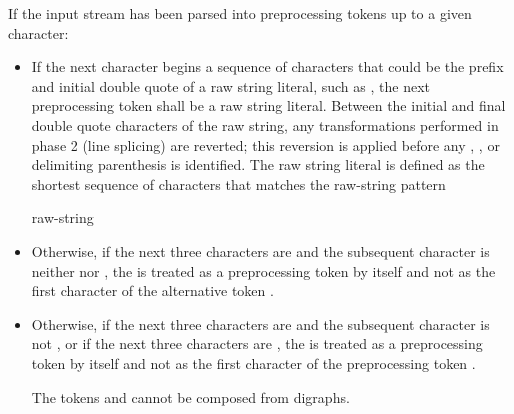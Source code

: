 \pnum
If the input stream has been parsed into preprocessing tokens up to a
given character:
\begin{itemize}
\item
{}%
If the next character begins a sequence of characters that could be the prefix
and initial double quote of a raw string literal, such as , the next preprocessing
token shall be a raw string literal. Between the initial and final
double quote characters of the raw string, any transformations performed in phase
2 (line splicing) are reverted; this reversion
is applied before any , , or delimiting
parenthesis is identified. The raw string literal is defined as the shortest sequence
of characters that matches the raw-string pattern
\begin{ncbnf}
  raw-string
\end{ncbnf}

\item Otherwise, if the next three characters are \tcode{<::} and the subsequent character
is neither \tcode{:} nor \tcode{>}, the \tcode{<} is treated as a preprocessing token by
itself and not as the first character of the alternative token \tcode{<:}.

\item
Otherwise, if the next three characters are \tcode{[::} and
the subsequent character is not \tcode{:}, or
if the next three characters are \tcode{[:>},
the \tcode{[} is treated as a preprocessing token by itself and
not as the first character of the preprocessing token \tcode{[:}.
\begin{note}
The tokens \tcode{[:} and \tcode{:]} cannot be composed from digraphs.
\end{note}


\end{itemize}
